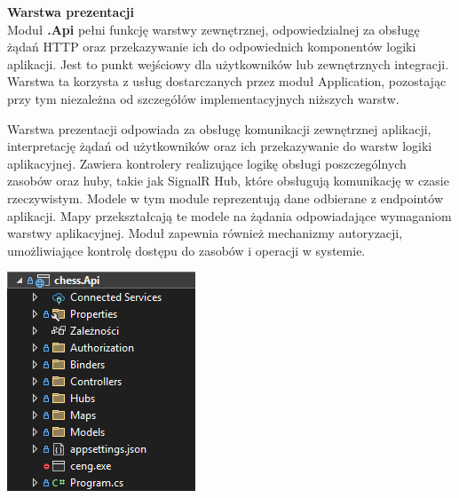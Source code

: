 \documentclass[12pt,a4paper]{article}
\begin{document}
\newpage

\noindent \textbf{Warstwa prezentacji}\\
Moduł \textbf{.Api} pełni funkcję warstwy zewnętrznej, odpowiedzialnej za obsługę żądań HTTP oraz przekazywanie ich do odpowiednich komponentów logiki aplikacji. Jest to punkt wejściowy dla użytkowników lub zewnętrznych integracji. Warstwa ta korzysta z usług dostarczanych przez moduł Application, pozostając przy tym niezależna od szczegółów implementacyjnych niższych warstw.

\vspace{0.5cm}
\begin{minipage}[t]{0.45\textwidth}
    \vspace{0pt}
    \raggedright
    Warstwa prezentacji odpowiada za obsługę komunikacji zewnętrznej aplikacji, interpretację żądań od użytkowników oraz ich przekazywanie do warstw logiki aplikacyjnej. Zawiera kontrolery realizujące logikę obsługi poszczególnych zasobów oraz huby, takie jak SignalR Hub, które obsługują komunikację w czasie rzeczywistym. Modele w tym module reprezentują dane odbierane z endpointów aplikacji. Mapy przekształcają te modele na żądania odpowiadające wymaganiom warstwy aplikacyjnej. Moduł zapewnia również mechanizmy autoryzacji, umożliwiające kontrolę dostępu do zasobów i operacji w systemie.
\end{minipage}
\hfill
\begin{minipage}[t]{0.45\textwidth}
    \vspace{0pt}
    \centering
    \includegraphics[width=\linewidth]{images/struktura_back_api.png}
\end{minipage}
\vspace{0.5cm}
\end{document}
